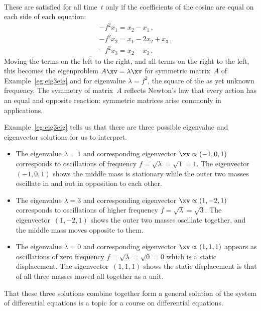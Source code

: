 \begin{example}
\begin{eqnarray*}
\end{eqnarray*}
These are satisfied for all time~\(t\) only if the coefficients of the cosine are equal on each side of each equation:
\begin{eqnarray*}
&&-f^2x_1=x_2-x_1\,,
\\&&-f^2x_2=x_1-2x_2+x_3\,,
\\&&-f^2x_3=x_2-x_3\,.
\end{eqnarray*}
Moving the terms on the left to the right, and all terms on the right to the left, this becomes the eigenproblem \(A\xv=\lambda\xv\) for symmetric matrix~\(A\) of Example~\ref{eg:eig3eig} and for eigenvalue \(\lambda=f^2\), the square of the as yet unknown frequency.
The symmetry of matrix~\(A\) reflects Newton's law that every action has an equal and opposite reaction: symmetric matrices arise commonly in applications.

Example~\ref{eg:eig3eig} tells us that there are three possible eigenvalue and eigenvector solutions for us to interpret.
\begin{itemize}
\item The eigenvalue \(\lambda=1\) and corresponding eigenvector \(\xv\propto(-1,0,1)\) corresponds to oscillations of frequency \(f=\sqrt\lambda=\sqrt 1=1\).
The eigenvector~\((-1,0,1)\) shows the middle mass is stationary while the outer two masses oscillate in and out in opposition to each other.
\item The eigenvalue \(\lambda=3\) and corresponding eigenvector \(\xv\propto(1,-2,1)\) corresponds to oscillations of higher frequency \(f=\sqrt\lambda=\sqrt 3\).
The eigenvector~\((1,-2,1)\) shows the outer two masses oscillate together, and the middle mass moves opposite to them.
\item The eigenvalue \(\lambda=0\) and corresponding eigenvector \(\xv\propto(1,1,1)\) appears as oscillations of zero frequency \(f=\sqrt\lambda=\sqrt 0=0\) which is a static displacement.
The eigenvector~\((1,1,1)\) shows the static displacement is that of all three masses moved all together as a unit.
\end{itemize}
That these three solutions combine together form a general solution of the system of differential equations is a topic for a course on differential equations.
\end{example}




